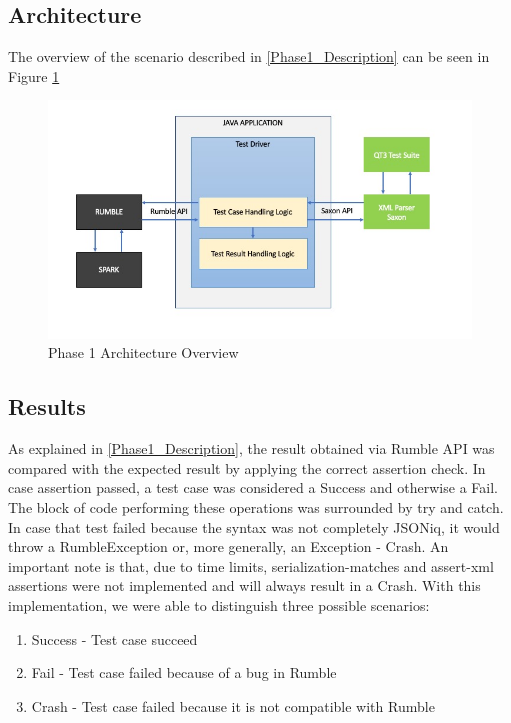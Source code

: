 \subsection{Architecture}
The overview of the scenario described in \ref{Phase1_Description} can be seen in Figure \ref{fig:Phase1_Architecture}
 \begin{figure}[h!]
 	\vspace*{-5mm}
 	\includegraphics[width=\linewidth]{architecture_diagram_phase_1.jpeg}
 	\vspace*{-15mm}
 	\caption{Phase 1 Architecture Overview}
 	\label{fig:Phase1_Architecture}
 \end{figure}

\vspace*{-5mm}
\subsection{Results}

\label{Phase1_Results}
As explained in \ref{Phase1_Description}, the result obtained via Rumble API was compared with the expected result by applying the correct assertion check. In case assertion passed, a test case was considered a Success and otherwise a Fail. The block of code performing these operations was surrounded by try and catch. In case that test failed because the syntax was not completely JSONiq, it would throw a RumbleException or, more generally, an Exception - Crash. An important note is that, due to time limits, serialization-matches and assert-xml assertions were not implemented and will always result in a Crash. With this implementation, we were able to distinguish three possible scenarios:

\begin{enumerate}
	\item Success - Test case succeed
	\item Fail - Test case failed because of a bug in Rumble
	\item Crash - Test case failed because it is not compatible with Rumble
\end{enumerate}

